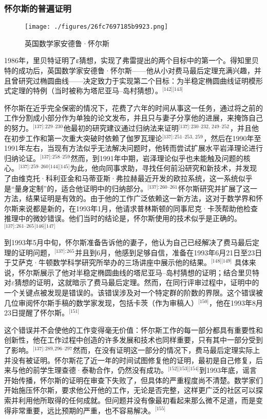 \subsubsection{怀尔斯的普遍证明}
\begin{figure}[ht]
\centering
\texttt{[image: ./figures/26fc7697185b9923.png]}
\caption{英国数学家安德鲁·怀尔斯} \label{fig_FMDL_2}
\end{figure}
1986年，里贝特证明了ε猜想，实现了弗雷提出的两个目标中的第一个。得知里贝特的成功后，英国数学家安德鲁·怀尔斯——他从小对费马最后定理充满兴趣，并且曾研究过椭圆曲线——决定致力于实现第二个目标：为半稳定椭圆曲线证明模形式定理的特例（当时被称为塔尼亚马–岛村猜想）。\(^\text{[142][143]}\)

怀尔斯在近乎完全保密的情况下，花费了六年的时间从事这一任务，通过将之前的工作分割成小部分作为单独的论文发布，并且只与妻子分享他的进展，来掩饰自己的努力。\(^\text{[137]: 229–230}\) 他最初的研究建议通过归纳法来证明\(^\text{[137]: 230–232, 249–252 }\)，并且他在初步工作和第一次重大突破时依赖了伽罗瓦理论\(^\text{[137]: 251–253, 259 }\)，然后在1990年至1991年左右，当现有方法似乎无法解决问题时，他转而尝试扩展水平岩泽理论进行归纳论证。\(^\text{[137]: 258–259}\) 然而，到1991年中期，岩泽理论似乎也未能触及问题的核心。\(^\text{[137]: 259–260 [144][145]}\)为此，他向同事求助，寻找任何前沿研究和新技术，并发现了由维克托·科利亚金和马蒂亚斯·弗拉赫最近开发的欧拉系统，这一系统似乎是“量身定制”的，适合他证明中的归纳部分。\(^\text{[137]: 260–261}\) 怀尔斯研究并扩展了这一方法，结果证明是有效的。由于他的工作广泛依赖这一新方法，这对于数学界和怀尔斯来说都是新的，在1993年1月，他请求普林斯顿的同事尼克·卡茨帮助他检查推理中的微妙错误。他们当时的结论是，怀尔斯使用的技术似乎是正确的。\(^\text{[137]: 261–265 [146][147]}\)

到1993年5月中旬，怀尔斯准备告诉他的妻子，他认为自己已经解决了费马最后定理的证明问题，\(^\text{[137]: 265}\) 并且到6月，他感到足够自信，准备在1993年6月21日至23日于艾萨克·牛顿数学科学研究所举办的三场讲座中展示他的结果。\(^\text{[148][149]}\) 具体来说，怀尔斯展示了他对半稳定椭圆曲线的塔尼亚马–岛村猜想的证明；结合里贝特对\(\varepsilon\)猜想的证明，这就暗示了费马最后定理。然而，在同行评审过程中，证明中的一个关键点被发现是错误的。该错误涉及对一个特定群的阶数的界限。这个错误被几位审阅怀尔斯手稿的数学家发现，包括卡茨（作为审稿人）\(^\text{[150]}\)，他在1993年8月23日提醒了怀尔斯。\(^\text{[151]}\)

这个错误并不会使他的工作变得毫无价值：怀尔斯工作的每一部分都具有重要性和创新性，他在工作过程中创造的许多发展和技术也同样重要，只有其中一部分受到了影响。\(^\text{[137]: 289, 296–297}\) 然而，在没有证明这一部分的情况下，费马最后定理实际上并没有被证明。怀尔斯花了近一年的时间试图修复他的证明，最初是自己修复，后来与他的前学生理查德·泰勒合作，仍然没有成功。\(^\text{[152][153][154]}\)到1993年底，谣言开始传播，怀尔斯的证明在审查下失败了，但具体的严重程度尚不清楚。数学家们开始施压怀尔斯，要求他公开他的工作，无论是否完整，这样更广泛的社区可以探索并利用他所取得的任何成就。但问题并没有像最初看起来那么微不足道，而是变得非常重要，远比预期的严重，也不容易解决。\(^\text{[155]}\)

